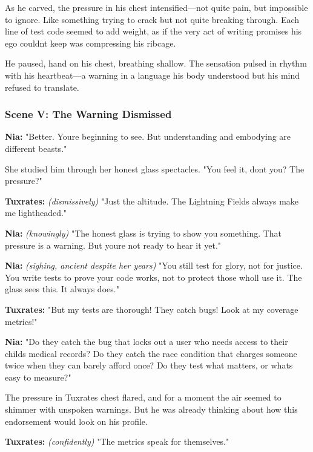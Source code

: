 As he carved, the pressure in his chest intensified---not quite pain, but impossible to ignore. Like something trying to crack but not quite breaking through. Each line of test code seemed to add weight, as if the very act of writing promises his ego couldn\textquotesingle t keep was compressing his ribcage.

He paused, hand on his chest, breathing shallow. The sensation pulsed in rhythm with his heartbeat---a warning in a language his body understood but his mind refused to translate.

\bookdivider

\subsubsection{Scene V: The Warning Dismissed}\label{scene-v-the-warning-dismissed}

\textbf{Nia:} "Better. You\textquotesingle re beginning to see. But understanding and embodying are different beasts."

She studied him through her honest glass spectacles. "You feel it, don\textquotesingle t you? The pressure?"

\textbf{Tuxrates:} \emph{(dismissively)} "Just the altitude. The Lightning Fields always make me lightheaded."

\textbf{Nia:} \emph{(knowingly)} "The honest glass is trying to show you something. That pressure is a warning. But you\textquotesingle re not ready to hear it yet."

\textbf{Nia:} \emph{(sighing, ancient despite her years)} "You still test for glory, not for justice. You write tests to prove your code works, not to protect those who\textquotesingle ll use it. The glass sees this. It always does."

\textbf{Tuxrates:} "But my tests are thorough! They catch bugs! Look at my coverage metrics!"

\textbf{Nia:} "Do they catch the bug that locks out a user who needs access to their child\textquotesingle s medical records? Do they catch the race condition that charges someone twice when they can barely afford once? Do they test what matters, or what\textquotesingle s easy to measure?"

The pressure in Tuxrates\textquotesingle{} chest flared, and for a moment the air seemed to shimmer with unspoken warnings. But he was already thinking about how this endorsement would look on his profile.

\textbf{Tuxrates:} \emph{(confidently)} "The metrics speak for themselves."


